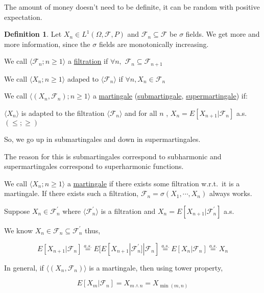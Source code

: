 \documentclass{article}
\theoremstyle{definition}
\newtheorem{definition}{Definition}
\begin{document}
The amount of money doesn't need to be definite, it can be random with positive expectation.

\begin{definition}
    Let \(X_n \in L^1(\Omega , \mathscr{F} , P)\) and \(\mathscr{F}_n \subseteq \mathscr{F}\) be \(\sigma\) fields. We get more and more information, since the \(\sigma\) fields are monotonically increasing.

    We call \(\langle \mathscr{F}_n ; n \geq 1 \rangle \) a \underline{filtration} if \(\forall n,\) \(\mathscr{F}_n \subseteq \mathscr{F}_{n+1}\) 

    We call \(\langle X_n ; n \geq 1 \rangle \) adaped to \(\langle \mathscr{F}_n \rangle \) if \(\forall n, X_n \in \mathscr{F}_n\) 

    We call \(\langle (X_n, \mathscr{F}_n) ; n\geq 1 \rangle \) a \underline{martingale} (\underline{submartingale}, \underline{supermartingale}) if:

    \(\langle X_n \rangle \) is adapted to the filtration \(\langle \mathscr{F}_n \rangle \) and for all \(n\) , \(X_n = E[X_{n+1}|\mathscr{F}_n]\) a.s. \((\leq ; \geq)\) 

    So, we go up in submartingales and down in supermartingales.

    The reason for this is submartingales correspond to subharmonic and supermartingales correspond to superharmonic functions.

    We call \(\langle X_n; n\geq 1 \rangle \) a \underline{martingale} if there exists some filtration w.r.t.\ it is a martingale. If there exists such a filtration, \(\mathscr{F}_n = \sigma(X_1,\cdots, X_n)\) always works.

    Suppose \(X_n \in \mathscr{F}_n^{\prime}\) where \(\langle \mathscr{F}_n^{\prime} \rangle \) is a filtration and \(X_n = E[X_{n+1}|\mathscr{F}_n^{\prime}]\) a.s.

    We know \(X_n \in \mathscr{F}_n \subseteq \mathscr{F}_n^{\prime} \) thus,

    \[
        E[X_{n+1}|\mathscr{F}_n] \overset{a.s.}{=} E[E[X_{n+1}|\mathscr{F}_n^{\prime} ]|\mathscr{F}_n] \overset{a.s.}{=} E[X_n | \mathscr{F}_n] \overset{a.s.}{=} X_n
    \]

    In general, if \(\langle (X_n, \mathscr{F}_n) \rangle \) is a martingale, then using tower property,

    \[
        E[X_m | \mathscr{F}_n] = X_{m \land n} = X_{\min(m,n)}
    \]

\end{definition}
\end{document}
